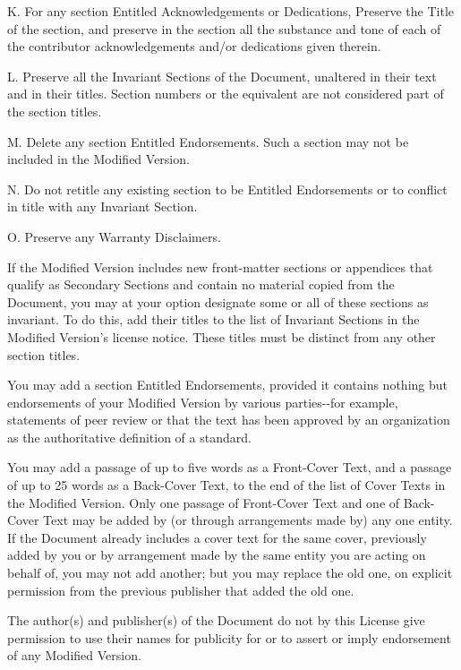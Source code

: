 K. For any section Entitled
{\textquotedbl}Acknowledgements{\textquotedbl} or
{\textquotedbl}Dedications{\textquotedbl}, Preserve the Title of the
section, and preserve in the section all the substance and tone of
each of the contributor acknowledgements and/or dedications given
therein.

L. Preserve all the Invariant Sections of the Document, unaltered in
their text and in their titles. Section numbers or the equivalent are
not considered part of the section titles.

M. Delete any section Entitled
{\textquotedbl}Endorsements{\textquotedbl}. Such a section may not be
included in the Modified Version.

N. Do not retitle any existing section to be Entitled
{\textquotedbl}Endorsements{\textquotedbl} or to conflict in title
with any Invariant Section.

O. Preserve any Warranty Disclaimers.

If the Modified Version includes new front-matter sections or
appendices that qualify as Secondary Sections and contain no material
copied from the Document, you may at your option designate some or all
of these sections as invariant. To do this, add their titles to the
list of Invariant Sections in the Modified Version's license
notice. These titles must be distinct from any other section titles.

You may add a section Entitled
{\textquotedbl}Endorsements{\textquotedbl}, provided it contains
nothing but endorsements of your Modified Version by various
parties-{}-for example, statements of peer review or that the text has
been approved by an organization as the authoritative definition of a
standard.

You may add a passage of up to five words as a Front-Cover Text, and a
passage of up to 25 words as a Back-Cover Text, to the end of the list
of Cover Texts in the Modified Version. Only one passage of
Front-Cover Text and one of Back-Cover Text may be added by (or
through arrangements made by) any one entity. If the Document already
includes a cover text for the same cover, previously added by you or
by arrangement made by the same entity you are acting on behalf of,
you may not add another; but you may replace the old one, on explicit
permission from the previous publisher that added the old one.

The author(s) and publisher(s) of the Document do not by this License
give permission to use their names for publicity for or to assert or
imply endorsement of any Modified Version.


